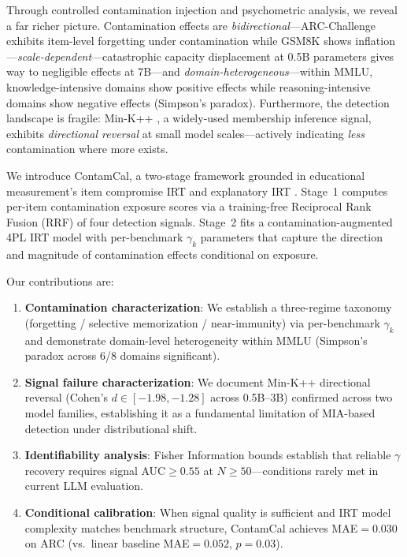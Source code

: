 \documentclass[11pt,a4paper]{article}
\newcommand{\gam}{\gamma}
\begin{document}
Through controlled contamination injection and psychometric analysis, we reveal a far richer picture. Contamination effects are \emph{bidirectional}---ARC-Challenge exhibits item-level forgetting under contamination while GSM8K shows inflation---\emph{scale-dependent}---catastrophic capacity displacement at 0.5B parameters gives way to negligible effects at 7B---and \emph{domain-heterogeneous}---within MMLU, knowledge-intensive domains show positive effects while reasoning-intensive domains show negative effects (Simpson's paradox). Furthermore, the detection landscape is fragile: Min-K++ \cite{shi2024detecting}, a widely-used membership inference signal, exhibits \emph{directional reversal} at small model scales---actively indicating \emph{less} contamination where more exists.

We introduce ContamCal, a two-stage framework grounded in educational measurement's item compromise IRT \cite{eckerly2017detecting,sinharay2017assessing} and explanatory IRT \cite{deboeck2004explanatory}. Stage~1 computes per-item contamination exposure scores via a training-free Reciprocal Rank Fusion (RRF) \cite{cormack2009reciprocal} of four detection signals. Stage~2 fits a contamination-augmented 4PL IRT model with per-benchmark $\gam_k$ parameters that capture the direction and magnitude of contamination effects conditional on exposure.

Our contributions are:
\begin{enumerate}[leftmargin=*,nosep]
\item \textbf{Contamination characterization}: We establish a three-regime taxonomy (forgetting / selective memorization / near-immunity) via per-benchmark $\gam_k$ and demonstrate domain-level heterogeneity within MMLU (Simpson's paradox across 6/8 domains significant).
\item \textbf{Signal failure characterization}: We document Min-K++ directional reversal (Cohen's $d \in [{-}1.98, {-}1.28]$ across 0.5B--3B) confirmed across two model families, establishing it as a fundamental limitation of MIA-based detection under distributional shift.
\item \textbf{Identifiability analysis}: Fisher Information bounds establish that reliable $\gam$ recovery requires signal AUC${\geq}0.55$ at $N{\geq}50$---conditions rarely met in current LLM evaluation.
\item \textbf{Conditional calibration}: When signal quality is sufficient and IRT model complexity matches benchmark structure, ContamCal achieves MAE${=}0.030$ on ARC (vs.\ linear baseline MAE${=}0.052$, $p{=}0.03$).
\end{enumerate}
\end{document}
